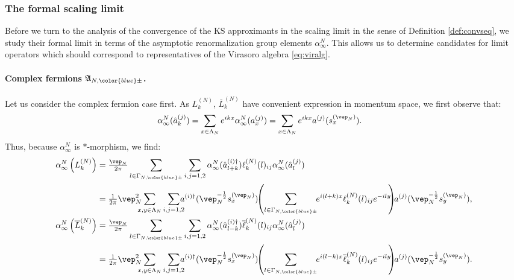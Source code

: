 \documentclass[a4paper, 11pt]{article}
\newcommand{\fA}{\mathfrak{A}}\newcommand{\cA}{\mathcal{A}}\newcommand{\dA}{\mathds{A}}\newcommand{\sA}{\mathscr{A}}
\DeclareMathOperator{\1}{\mathds{1}}
\begin{document}
\subsubsection{The formal scaling limit}
\label{sec:formallim}
Before we turn to the analysis of the convergence of the KS approximants in the scaling limit in the sense of Definition \ref{def:convseq}, we study their formal limit in terms of the asymptotic renormalization group elements $\alpha^{N}_{\infty}$. This allows us to determine candidates for limit operators which should correspond to representatives of the Virasoro algebra \eqref{eq:viralg}.
\paragraph{Complex fermions $\fA_{N,{\color{blue}\pm}}$.}
Let us consider the complex fermion case first. As $L^{(N)}_{k}$, $\overline{L}^{(N)}_{k}$ have convenient expression in momentum space, we first observe that:
\begin{align}
\label{eq:rglimalgFT}
\alpha^{N}_{\infty}(\hat{a}^{(j)}_{k}) & = \sum_{x\in\Lambda_{N}}e^{ikx}\alpha^{N}_{\infty}(a^{(j)}_{x}) = \sum_{x\in\Lambda_{N}}e^{ikx}a^{(j)}(s^{(\vep_{N})}_{x}).
\end{align}
Thus, because $\alpha^{N}_{\infty}$ is $*$-morphism, we find:
\begin{align}
\label{eq:limrglatvira}
\alpha^{N}_{\infty}\left(L^{(N)}_{k}\right) & = \tfrac{\vep_{N}}{2\pi}\sum_{l\in\Gamma_{N,{\color{blue}\pm}}}\sum_{i,j=1,2}\alpha^{N}_{\infty}(\hat{a}^{(i)\dag}_{l+k})\ell^{(N)}_{k}(l)_{ij}\alpha^{N}_{\infty}(\hat{a}^{(j)}_{l}) \\ \nonumber
 & = \tfrac{1}{2\pi}\vep_{N}^{2}\!\!\!\!\sum_{x,y\in\Lambda_{N}}\sum_{i,j=1,2}\!\!\!\!a^{(i)\dag}(\vep_{N}^{-\frac{1}{2}} s^{(\vep_{N})}_{x})\!\!\left(\sum_{l\in\Gamma_{N,{\color{blue}\pm}}} \!\!e^{i(l+k)x}\ell^{(N)}_{k}(l)_{ij}e^{-ily} \!\!\right) \!\!a^{(j)}(\vep_{N}^{-\frac{1}{2}} s^{(\vep_{N})}_{y}),\\ \nonumber
\alpha^{N}_{\infty}\left(\overline{L}^{(N)}_{k}\right) & = \tfrac{\vep_{N}}{2\pi}\sum_{l\in\Gamma_{N,{\color{blue}\pm}}}\sum_{i,j=1,2}\alpha^{N}_{\infty}(\hat{a}^{(i)\dag}_{l-k})\overline{\ell}^{(N)}_{k}(l)_{ij}\alpha^{N}_{\infty}(\hat{a}^{(j)}_{l}) \\ \nonumber
 & = \tfrac{1}{2\pi}\vep_{N}^{2}\!\!\!\!\sum_{x,y\in\Lambda_{N}}\sum_{i,j=1,2}\!\!\!\!a^{(i)\dag}(\vep_{N}^{-\frac{1}{2}} s^{(\vep_{N})}_{x}) \!\!\left(\sum_{l\in\Gamma_{N,{\color{blue}\pm}}} \!\!e^{i(l-k)x}\overline{\ell}^{(N)}_{k}(l)_{ij}e^{-ily} \!\!\right) \!\!a^{(j)}(\vep_{N}^{-\frac{1}{2}} s^{(\vep_{N})}_{y}).
\end{align}
\end{document}
